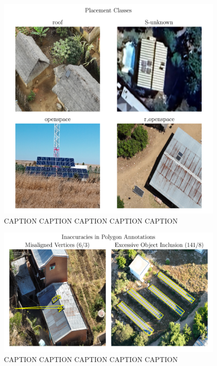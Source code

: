\documentclass[conference]{IEEEtran}
\begin{document}
\begin{figure}[H]
    \centering
    \includegraphics[width=1\linewidth]{assets/data_placement_classes.png}
    \caption{CAPTION CAPTION CAPTION CAPTION CAPTION}
    \label{fig:data_placement_classes}
\end{figure}

\begin{figure}[H]
    \centering
    \includegraphics[width=1\linewidth]{assets/data_poly_problems.png}
    \caption{CAPTION CAPTION CAPTION CAPTION CAPTION}
    \label{fig:data_poly_problems}
\end{figure}
\end{document}
